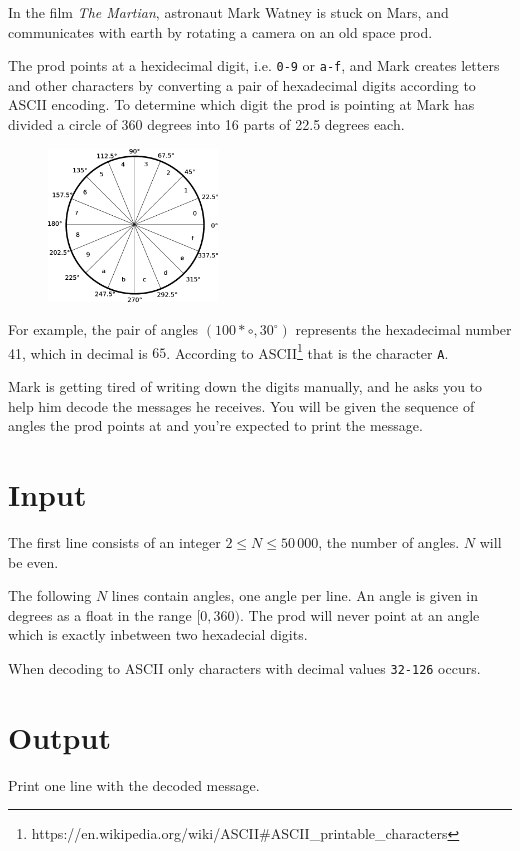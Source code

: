 
In the film \emph{The Martian}, astronaut Mark Watney is stuck on Mars, and communicates with earth by rotating a camera on an old space prod.

The prod points at a hexidecimal digit, i.e. \texttt{0-9} or \texttt{a-f}, and Mark creates letters and other characters by converting a pair
of hexadecimal digits according to ASCII encoding. To determine which digit the prod is pointing at Mark has divided a circle of 360 degrees into 16 parts of 22.5 degrees each.

\begin{figure}[h!]
  \begin{center}
    \includegraphics[width=0.4\textwidth]{angles.png}
  \end{center}
\end{figure}

For example, the pair of angles $(100*{\circ}, 30^{\circ})$ represents the hexadecimal number 41, which in decimal is $65$.
According to ASCII\footnote{https://en.wikipedia.org/wiki/ASCII\#ASCII\_printable\_characters} that is the character \texttt{A}.

Mark is getting tired of writing down the digits manually, and he asks you to help him decode the messages he receives. You will be given the sequence of angles the prod points at and you're expected to print the message.
\section*{Input}
The first line consists of an integer $2 \le N \le 50\,000$, the number of angles. $N$ will be even.

The following $N$ lines contain angles, one angle per line. An angle is given in degrees as a float in the range $[0, 360)$.
The prod will never point at an angle which is exactly inbetween two hexadecial digits.

When decoding to ASCII only characters with decimal values \texttt{32-126} occurs.
\section*{Output}
Print one line with the decoded message.
